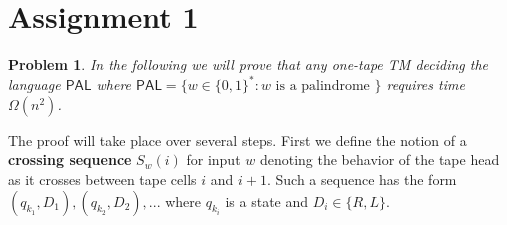 \documentclass[11pt]{article}
\def\PAL{\mathsf{PAL}}
\newtheorem{problem}{Problem}
\begin{document}
\rhead{\today}

\section*{Assignment 1}

\begin{problem}
In the following we will prove that any one-tape TM deciding the language $\PAL$ where $\PAL = \{w \in \{0,1\}^*: w \mbox{ is a palindrome }\}$ requires time $\Omega(n^2)$.
\end{problem}
The proof will take place over several steps. First we define the notion of a \textbf{crossing sequence} $S_w(i)$ for input $w$ denoting the behavior of the tape head as it crosses between tape cells $i$ and $i+1$. Such a sequence has the form $(q_{k_1}, D_1), (q_{k_2}, D_2), ...$ where $q_{k_i}$ is a state and $D_i \in \{R, L\}$.
\end{document}
